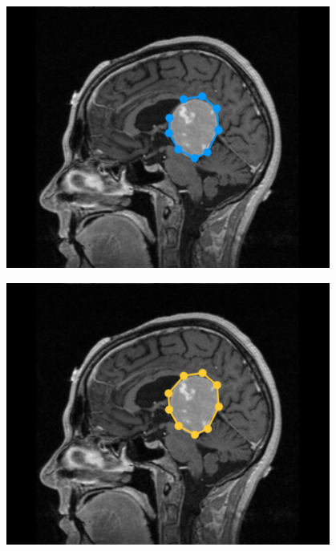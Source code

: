 \documentclass[final]{beamer}
\newlength{\sepmargin}
\newlength{\onecolwid}
\begin{document}
\begin{frame}[t]
\begin{columns}[t]
\begin{column}{\onecolwid}
\begin{block}{ }
\begin{multicols}{2}
\begin{figure}
\vspace*{-0.95cm}
\includegraphics[width=.8\linewidth]{screen2.png}
\end{figure}
\begin{figure}
\vspace*{-0.95cm}
\includegraphics[width=.8\linewidth]{screen3.png}
\end{figure}
\end{multicols}

\end{block}
\end{column}

\begin{column}{\sepmargin} \end{column}
\end{columns} 

\begin{columns}[t] %


\end{columns}
\end{frame}
\end{document}
